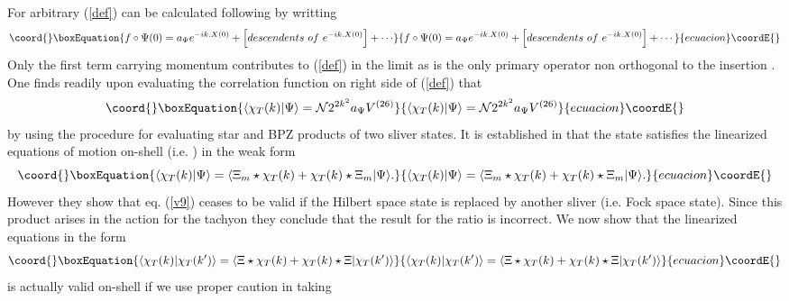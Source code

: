 \documentclass[a4paper,12pt]{article}
\begin{document}
For arbitrary \myHighlight{$|\Psi\rangle$}\coordHE{} (\ref{def}) can be calculated following
\cite{rsz1} by writting
\begin{equation}\coord{}\boxEquation{
f\circ\Psi(0)=a_\Psi e^{-ik.X(0)}+
\left[descendents\,\, of\,\, e^{-ik.X(0)}\right] + \cdots
\label{10}
}{
f\circ\Psi(0)=a_\Psi e^{-ik.X(0)}+
\left[descendents\,\, of\,\, e^{-ik.X(0)}\right] + \cdots
}{ecuacion}\coordE{}\end{equation}
 Only the first term carrying momentum \coordHE{} contributes to (\ref{def})
 in the \coordHE{} limit as \coordHE{} is the only primary operator
 non orthogonal to the insertion \coordHE{}.
One finds readily upon evaluating the correlation function on right side of
(\ref{def}) that
\begin{equation}\coord{}\boxEquation{
\langle\chi_T(k)|\Psi\rangle=\mathcal{N} 2^{2k^2}a_\Psi V^{(26)}
\label{def1}
}{
\langle\chi_T(k)|\Psi\rangle=\mathcal{N} 2^{2k^2}a_\Psi V^{(26)}
}{ecuacion}\coordE{}\end{equation}
by using the procedure for evaluating star and BPZ products of two sliver
states.
 It is established in \cite{rsz1} that the state \coordHE{} satisfies
the linearized equations of motion on-shell (i.e. \coordHE{}) in the weak form
\begin{equation}\coord{}\boxEquation{
\langle\chi_T(k)|\Psi\rangle=
\langle\Xi_m\star\chi_T(k)+\chi_T(k)\star\Xi_m|\Psi\rangle .
\label{v9}
}{
\langle\chi_T(k)|\Psi\rangle=
\langle\Xi_m\star\chi_T(k)+\chi_T(k)\star\Xi_m|\Psi\rangle .
}{ecuacion}\coordE{}\end{equation}
However they show that eq. (\ref{v9}) ceases
to be valid if the Hilbert space
state \myHighlight{$|\Psi\rangle$}\coordHE{} is replaced by another sliver
\coordHE{} (i.e. Fock space state). Since this product arises
in the action for the tachyon they conclude that the result for the ratio
\coordHE{} is incorrect.
We now show that the linearized equations in the form
\begin{equation}\coord{}\boxEquation{
\langle\chi_T(k)|\chi_T(k')\rangle=
\langle\Xi\star\chi_T(k)+\chi_T(k)\star\Xi|\chi_T(k')\rangle
\label{v10}
}{
\langle\chi_T(k)|\chi_T(k')\rangle=
\langle\Xi\star\chi_T(k)+\chi_T(k)\star\Xi|\chi_T(k')\rangle
}{ecuacion}\coordE{}\end{equation}
is actually valid on-shell if we use proper caution in taking
\end{document}
